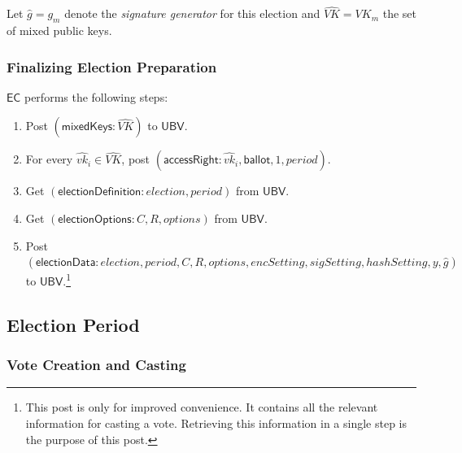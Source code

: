 \documentclass[bibtotoc,halfparskip,oneside]{scrreprt}
\newcommand{\descrElection}{\mathit{election}\xspace}
\newcommand{\descrOptions}{\mathit{options}\xspace}
\newcommand{\period}{\mathit{period}\xspace}
\newcommand{\vkhat}[1]{\hat{\mathit{vk}}_{#1}\xspace}
\newcommand{\EC}{\ensuremath{\mathsf{EC}}\xspace}
\newcommand{\UBV}{\ensuremath{\mathsf{UBV}}\xspace}
\begin{document}
	Let $\hat{g}=g_m$ denote the \emph{signature generator} for this election and $\hat{\mathit{VK}}=\mathit{VK}_m$ the set of mixed public keys. 
	
	\subsubsection{Finalizing Election Preparation}
	
	\EC performs the following steps:
	\begin{enumerate}
		\item Post $(\mathsf{mixedKeys}:\hat{\mathit{VK}})$ to \UBV.
		\item For every $\vkhat{i}\in \hat{\mathit{VK}}$, post $(\mathsf{accessRight}:\vkhat{i}, \mathsf{ballot}, 1,\period)$.
		\item Get $(\mathsf{electionDefinition}: \descrElection,\period)$ from \UBV.
		\item Get $(\mathsf{electionOptions}:C,R,\descrOptions)$ from \UBV.
		\item Post $(\mathsf{electionData}:\descrElection, \period, C, R, \descrOptions, \mathit{encSetting},\mathit{sigSetting},\mathit{hashSetting},y, \hat{g})$ to \UBV.\footnote{This post is only for improved convenience. It contains all the relevant information for casting a vote. Retrieving this information in a single step is the purpose of this post.}
	\end{enumerate}
	
	\subsection{Election Period}\label{election_period}
	
	\subsubsection{Vote Creation and Casting}
	
\end{document}

